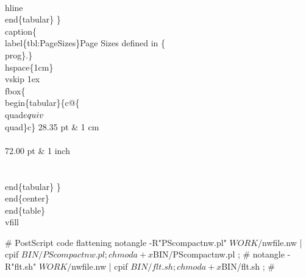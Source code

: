 \documentclass[11pt]{article}
\def\nwendcode{\endtrivlist \endgroup} %
\let\nwdocspar=\par                    %
\begin{document}
\nwenddocs{}\endmoddef
  \\hline %
 \\end\{tabular\}
\} %
\\caption\{\\label\{tbl:PageSizes\}Page Sizes defined in \{\\prog\}.\}\\hspace\{1cm\}
\\vskip 1ex
\\fbox\{
\\begin\{tabular\}\{c@\{\\quad$\\equiv$\\quad\}c\}
28.35 pt & 1 cm   \\\\
72.00 pt & 1 inch \\\\
\\end\{tabular\}
\} %
\\end\{center\}
\\end\{table\}
\\vfill
\nwendcode{}\nwdocspar

\newpage

\label{sec:PSnowebfilter}


\nwenddocs{}\plusendmoddef
# PostScript code flattening
notangle -R"PScompactnw.pl" $WORK/$nwfile.nw | cpif $BIN/PScompactnw.pl ;
chmod a+x $BIN/PScompactnw.pl ;
#
notangle -R"flt.sh" $WORK/$nwfile.nw | cpif $BIN/flt.sh ;
chmod a+x $BIN/flt.sh ;
#
\nwendcode{}\nwdocspar
\end{document}
